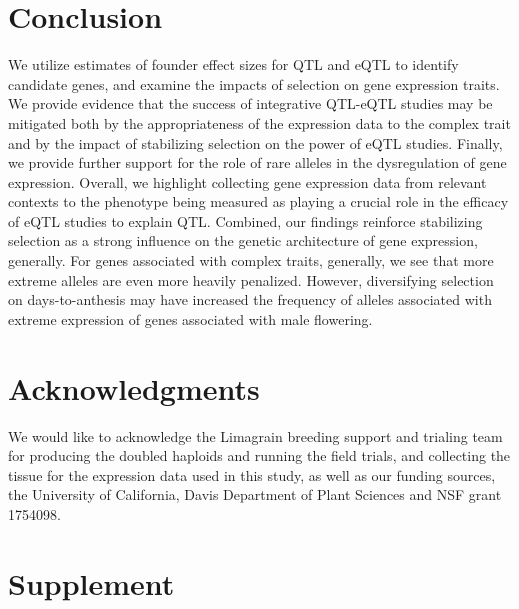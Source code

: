 \documentclass[article,9pt,twocolumn,twoside]{rilabRxiv}
\newcommand{\beginsupplement}{%
        \setcounter{table}{0}
        \renewcommand{\thetable}{S\arabic{table}}%
        \setcounter{figure}{0}
        \renewcommand{\thefigure}{S\arabic{figure}}%
     }
\begin{document}
\section{Conclusion}
We utilize estimates of founder effect sizes for QTL and eQTL to identify candidate genes, and examine the impacts of selection on gene expression traits.
We provide evidence that the success of integrative QTL-eQTL studies may be mitigated both by the appropriateness of the expression data to the complex trait and by the impact of stabilizing selection on the power of eQTL studies.
Finally, we provide further support for the role of rare alleles in the dysregulation of gene expression.
Overall, we highlight collecting gene expression data from relevant contexts to the phenotype being measured as playing a crucial role in the efficacy of eQTL studies to explain QTL.
Combined, our findings reinforce stabilizing selection as a strong influence on the genetic architecture of gene expression, generally.
For genes associated with complex traits, generally, we see that more extreme alleles are even more heavily penalized.
However, diversifying selection on days-to-anthesis may have increased the frequency of alleles associated with extreme expression of genes associated with male flowering.

\section{Acknowledgments}
We would like to acknowledge the Limagrain breeding support and trialing team for producing the doubled haploids and running the field trials, and collecting the tissue for the expression data used in this study, as well as our funding sources, the University of California, Davis Department of Plant Sciences and NSF grant 1754098.



\beginsupplement
\onecolumn
\section*{Supplement}
\end{document}

